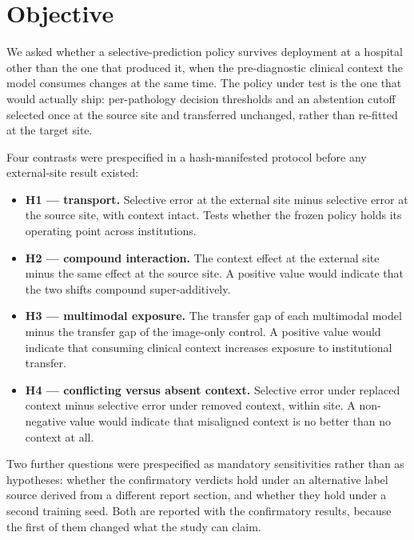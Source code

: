 \section{Objective}
\label{sec:objective}


We asked whether a selective-prediction policy survives deployment at a hospital
other than the one that produced it, when the pre-diagnostic clinical context
the model consumes changes at the same time. The policy under test is the one
that would actually ship: per-pathology decision thresholds and an abstention
cutoff selected once at the source site and transferred unchanged, rather than
re-fitted at the target site.

Four contrasts were prespecified in a hash-manifested protocol before any
external-site result existed:

\begin{itemize}
  \item \textbf{H1 --- transport.} Selective error at the external site minus
    selective error at the source site, with context intact. Tests whether the
    frozen policy holds its operating point across institutions.
  \item \textbf{H2 --- compound interaction.} The context effect at the
    external site minus the same effect at the source site. A positive value
    would indicate that the two shifts compound super-additively.
  \item \textbf{H3 --- multimodal exposure.} The transfer gap of each
    multimodal model minus the transfer gap of the image-only control. A
    positive value would indicate that consuming clinical context increases
    exposure to institutional transfer.
  \item \textbf{H4 --- conflicting versus absent context.} Selective error
    under replaced context minus selective error under removed context, within
    site. A non-negative value would indicate that misaligned context is no
    better than no context at all.
\end{itemize}

Two further questions were prespecified as mandatory sensitivities rather than
as hypotheses: whether the confirmatory verdicts hold under an alternative
label source derived from a different report section, and whether they hold
under a second training seed. Both are reported with the confirmatory results,
because the first of them changed what the study can claim.
